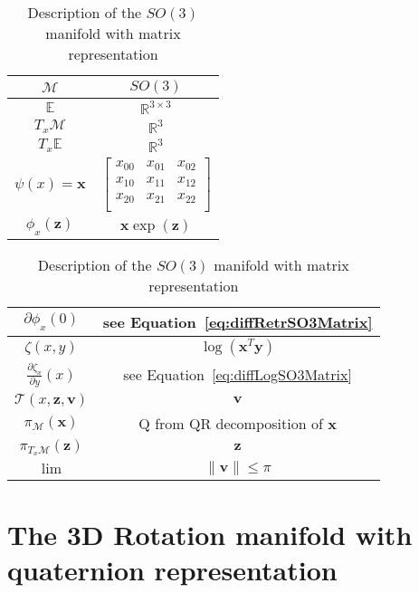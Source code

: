 \begin{table} [H]
\caption{Description of the $SO(3)$ manifold with matrix representation}
\centering
\begin{tabular}{cc}
  \toprule
  $\mathcal{M}$ & $SO(3)$ \\
  \midrule
  $\mathbb{E}$ & $\mathbb{R}^{3\times 3}$ \\
  \midrule
  $T_x\mathcal{M}$ & $\mathbb{R}^3$ \\
  \midrule
  $T_x\mathbb{E}$ & $\mathbb{R}^3$ \\
  \midrule
  $\psi(x) = \mathbf{x}$ & $ \begin{bmatrix}
    x_{00} & x_{01} & x_{02} \\
    x_{10} & x_{11} & x_{12} \\
    x_{20} & x_{21} & x_{22} \\
  \end{bmatrix} $ \\
  \midrule
  $\phi_x(\mathbf{z})$ & $\mathbf{x}\exp(\mathbf{z})$ \\
  \bottomrule
\end{tabular}
\quad
\begin{tabular}{cc}
  \toprule
  $\partial \phi_x(0)$ & see Equation~\ref{eq:diffRetrSO3Matrix} \\
  \midrule
  $\zeta(x,y)$ & $\log(\mathbf{x}^T\mathbf{y})$ \\
  \midrule
  $\frac{\partial \zeta_x}{\partial y}(x)$ & see Equation~\ref{eq:diffLogSO3Matrix} \\
  \midrule
  $\mathcal{T}(x,\mathbf{z}, \mathbf{v})$ & $\mathbf{v}$ \\
  \midrule
  $\pi_\mathcal{M}(\mathbf{x})$ & Q from QR decomposition of $\mathbf{x}$ \\
  \midrule
  $\pi_{T_x\mathcal{M}}(\mathbf{z})$ & $\mathbf{z}$ \\
  \midrule
  $\lim$ & $\|\mathbf{v}\| \leq \pi$ \\
  \bottomrule
\end{tabular}
\end{table}


\section{The 3D Rotation manifold with quaternion representation}
\label{sec:the_3d_rotation_manifold_quaternion_representation}

